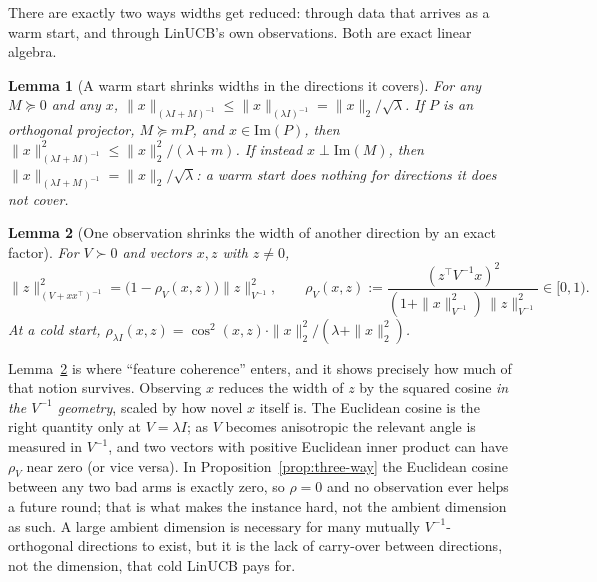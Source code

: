 \documentclass{article}
\newtheorem{lemma}{Lemma}
\theoremstyle{definition}
\theoremstyle{remark}
\theoremstyle{remark}
\begin{document}
There are exactly two ways widths get reduced: through data that arrives as a
warm start, and through LinUCB's own observations. Both are exact linear
algebra.

\begin{lemma}[A warm start shrinks widths in the directions it covers]
\label{lem:loewner}
For any $M\succeq0$ and any $x$, $\|x\|_{(\lambda I+M)^{-1}}\le\|x\|_{(\lambda I)^{-1}}=\|x\|_2/\sqrt\lambda$.
If $P$ is an orthogonal projector, $M\succeq mP$, and $x\in\mathrm{Im}(P)$, then
$\|x\|^2_{(\lambda I+M)^{-1}}\le\|x\|_2^2/(\lambda+m)$. If instead $x\perp\mathrm{Im}(M)$,
then $\|x\|_{(\lambda I+M)^{-1}}=\|x\|_2/\sqrt\lambda$: a warm start does nothing
for directions it does not cover.
\end{lemma}

\begin{lemma}[One observation shrinks the width of another direction by an
exact factor]
\label{lem:transfer}
For $V\succ0$ and vectors $x,z$ with $z\ne0$,
\[
\|z\|^2_{(V+xx^\top)^{-1}}=\bigl(1-\rho_V(x,z)\bigr)\|z\|^2_{V^{-1}},
\qquad
\rho_V(x,z):=\frac{(z^\top V^{-1}x)^2}{(1+\|x\|^2_{V^{-1}})\,\|z\|^2_{V^{-1}}}\in[0,1).
\]
At a cold start, $\rho_{\lambda I}(x,z)=\cos^2(x,z)\cdot\|x\|_2^2/(\lambda+\|x\|_2^2)$.
\end{lemma}

Lemma~\ref{lem:transfer} is where ``feature coherence'' enters, and it shows
precisely how much of that notion survives. Observing $x$ reduces the width of
$z$ by the squared cosine \emph{in the $V^{-1}$ geometry}, scaled by how novel
$x$ itself is. The Euclidean cosine is the right quantity only at $V=\lambda I$;
as $V$ becomes anisotropic the relevant angle is measured in $V^{-1}$, and two
vectors with positive Euclidean inner product can have $\rho_V$ near zero (or
vice versa). In Proposition~\ref{prop:three-way} the Euclidean cosine between
any two bad arms is exactly zero, so $\rho=0$ and no observation ever helps a
future round; that is what makes the instance hard, not the ambient dimension
as such. A large ambient dimension is necessary for many mutually
$V^{-1}$-orthogonal directions to exist, but it is the lack of carry-over
between directions, not the dimension, that cold LinUCB pays for.
\end{document}
